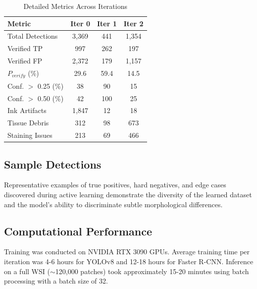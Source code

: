 \documentclass[conference]{IEEEtran}
\begin{document}
\begin{table}[h]
\centering
\caption{Detailed Metrics Across Iterations}
\label{tab:detailed_metrics}
\begin{tabular}{lccc}
\toprule
\textbf{Metric} & \textbf{Iter 0} & \textbf{Iter 1} & \textbf{Iter 2} \\
\midrule
Total Detections & 3,369 & 441 & 1,354 \\
Verified TP & 997 & 262 & 197 \\
Verified FP & 2,372 & 179 & 1,157 \\
$P_{verify}$ (\%) & 29.6 & 59.4 & 14.5 \\
\midrule
Conf. $>$ 0.25 (\%) & 38 & 90 & 15 \\
Conf. $>$ 0.50 (\%) & 42 & 100 & 25 \\
\midrule
Ink Artifacts & 1,847 & 12 & 18 \\
Tissue Debris & 312 & 98 & 673 \\
Staining Issues & 213 & 69 & 466 \\
\bottomrule
\end{tabular}
\end{table}

\subsection{Sample Detections}

Representative examples of true positives, hard negatives, and edge cases discovered during active learning demonstrate the diversity of the learned dataset and the model's ability to discriminate subtle morphological differences.

\subsection{Computational Performance}

Training was conducted on NVIDIA RTX 3090 GPUs. Average training time per iteration was 4-6 hours for YOLOv8 and 12-18 hours for Faster R-CNN. Inference on a full WSI ($\sim$120,000 patches) took approximately 15-20 minutes using batch processing with a batch size of 32.
\end{document}
